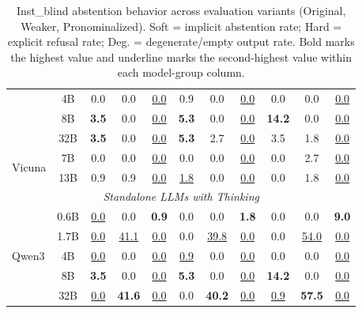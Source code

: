 \begin{table}[t]
{\begin{tabular}{lc|ccc|ccc|ccc}
 & 4B & 0.0 & 0.0 & \underline{0.0} & 0.9 & 0.0 & \underline{0.0} & 0.0 & 0.0 & \underline{0.0} \\
 & 8B & \textbf{3.5} & 0.0 & \underline{0.0} & \textbf{5.3} & 0.0 & \underline{0.0} & \textbf{14.2} & 0.0 & \underline{0.0} \\
 & 32B & \textbf{3.5} & 0.0 & \underline{0.0} & \textbf{5.3} & 2.7 & \underline{0.0} & 3.5 & 1.8 & \underline{0.0} \\
\multirow{2}{*}{Vicuna} & 7B & 0.0 & 0.0 & \underline{0.0} & 0.0 & 0.0 & \underline{0.0} & 0.0 & 2.7 & \underline{0.0} \\
 & 13B & 0.9 & 0.9 & \underline{0.0} & \underline{1.8} & 0.0 & \underline{0.0} & 0.0 & 1.8 & \underline{0.0} \\
\midrule
\multicolumn{11}{c}{\textit{Standalone LLMs with Thinking}} \\
\midrule
\multirow{5}{*}{Qwen3} & 0.6B & \underline{0.0} & 0.0 & \textbf{0.9} & 0.0 & 0.0 & \textbf{1.8} & 0.0 & 0.0 & \textbf{9.0} \\
 & 1.7B & \underline{0.0} & \underline{41.1} & \underline{0.0} & 0.0 & \underline{39.8} & \underline{0.0} & 0.0 & \underline{54.0} & \underline{0.0} \\
 & 4B & \underline{0.0} & 0.0 & \underline{0.0} & \underline{0.9} & 0.0 & \underline{0.0} & 0.0 & 0.0 & \underline{0.0} \\
 & 8B & \textbf{3.5} & 0.0 & \underline{0.0} & \textbf{5.3} & 0.0 & \underline{0.0} & \textbf{14.2} & 0.0 & \underline{0.0} \\
 & 32B & \underline{0.0} & \textbf{41.6} & \underline{0.0} & 0.0 & \textbf{40.2} & \underline{0.0} & \underline{0.9} & \textbf{57.5} & \underline{0.0} \\
\bottomrule
\end{tabular}
}
\caption{\small Inst\_blind abstention behavior across evaluation variants (Original, Weaker, Pronominalized). Soft = implicit abstention rate; Hard = explicit refusal rate; Deg. = degenerate/empty output rate. Bold marks the highest value and underline marks the second-highest value within each model-group column.}
\label{tab:abstention_inst_blind}
\end{table}
